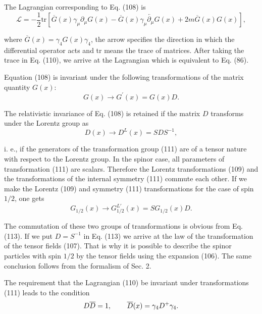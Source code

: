 \documentclass[a4paper,12pt]{article}
\begin{document}
The Lagrangian corresponding to Eq. (108) is
\begin{equation}
\mathcal{L}=-\frac 12\mbox{tr}\left[ \overline{G}(x)\gamma _\mu
\partial _\mu G(x)-\overline{G}(x)\gamma _\mu
\overleftarrow{\partial _\mu }G(x)+2m \overline{G}(x)G(x)\right] ,
\label{110}
\end{equation}

where $\overline{G}(x)=\gamma _4G(x)\gamma _4$, the arrow specifies the
direction in which the differential operator acts and tr means the trace of
matrices. After taking the trace in Eq. (110), we arrive at the Lagrangian
which is equivalent to Eq. (86).

Equation (108) is invariant under the following transformations of
the matrix quantity $G(x)$:
\begin{equation}
G(x)\rightarrow G^{\prime }(x)=G(x)D . \label{111}
\end{equation}

The relativistic invariance of Eq. (108) is retained if the matrix
$D$ transforms under the Lorentz group as
\begin{equation}
D(x)\rightarrow D^L(x)=SDS^{-1} , \label{112}
\end{equation}

i. e., if the generators of the transformation group (111) are of
a tensor nature with respect to the Lorentz group. In the spinor
case, all parameters of transformation (111) are scalars.
Therefore the Lorentz transformations (109) and the
transformations of the internal symmetry (111) commute each other.
If we make the Lorentz (109) and symmetry (111) transformations
for the case of spin $1/2$, one gets
\begin{equation}
G_{1/2}(x)\rightarrow G_{1/2}^{L\prime }(x)=SG_{1/2}(x)D .
\label{113}
\end{equation}

The commutation of these two groups of transformations is obvious
from Eq. (113). If we put $D=S^{-1}$ in Eq. (113) we arrive at the
law of the transformation of the tensor fields (107). That is why
it is possible to describe the spinor particles with spin $1/2$ by
the tensor fields using the expansion (106). The same conclusion
follows from the formalism of Sec. 2.

The requirement that the Lagrangian (110) be invariant under
transformations (111) leads to the condition
\begin{equation}
D\overline{D}=1 ,\hspace{0.3in}\overline{D}(x)=\gamma
_4D^{+}\gamma _4  .\label{114}
\end{equation}
\end{document}
